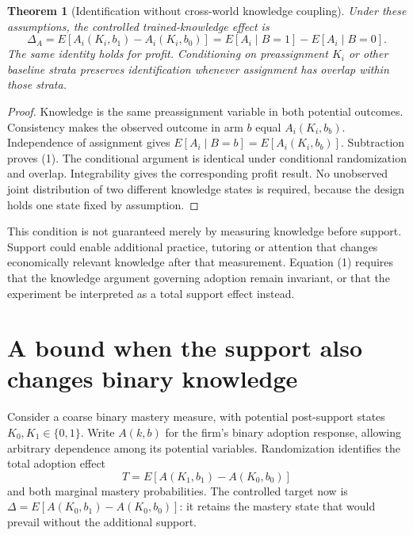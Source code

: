 \documentclass[11pt]{article}
\newtheorem{theorem}{Theorem}
\theoremstyle{definition}
\begin{document}
\begin{theorem}[Identification without cross-world knowledge coupling]
Under these assumptions, the controlled trained-knowledge effect is
\[
 \Delta_A=E[A_i(K_i,b_1)-A_i(K_i,b_0)]
          =E[A_i\mid B=1]-E[A_i\mid B=0].
 \tag{1}
\]
The same identity holds for profit. Conditioning on preassignment $K_i$ or other baseline strata preserves identification whenever assignment has overlap within those strata.
\end{theorem}
\begin{proof}
Knowledge is the same preassignment variable in both potential outcomes. Consistency makes the observed outcome in arm $b$ equal $A_i(K_i,b_b)$. Independence of assignment gives $E[A_i\mid B=b]=E[A_i(K_i,b_b)]$. Subtraction proves (1). The conditional argument is identical under conditional randomization and overlap. Integrability gives the corresponding profit result. No unobserved joint distribution of two different knowledge states is required, because the design holds one state fixed by assumption.
\end{proof}
This condition is not guaranteed merely by measuring knowledge before support. Support could enable additional practice, tutoring or attention that changes economically relevant knowledge after that measurement. Equation (1) requires that the knowledge argument governing adoption remain invariant, or that the experiment be interpreted as a total support effect instead.

\section*{A bound when the support also changes binary knowledge}
Consider a coarse binary mastery measure, with potential post-support states $K_0,K_1\in\{0,1\}$. Write $A(k,b)$ for the firm's binary adoption response, allowing arbitrary dependence among its potential variables. Randomization identifies the total adoption effect
\[
 T=E[A(K_1,b_1)-A(K_0,b_0)]
\]
and both marginal mastery probabilities. The controlled target now is
$\Delta=E[A(K_0,b_1)-A(K_0,b_0)]$: it retains the mastery state that would prevail without the additional support.
\end{document}
